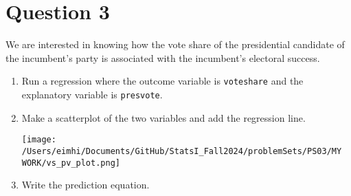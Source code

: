 \documentclass[12pt,letterpaper]{article}
\begin{document}
	\newpage	
\section*{Question 3}

\noindent We are interested in knowing how the vote share of the presidential candidate of the incumbent's party is associated with the incumbent's electoral success.
	\vspace{.25cm}
	\begin{enumerate}
		\item Run a regression where the outcome variable is \texttt{voteshare} and the explanatory variable is \texttt{presvote}.
			\vspace{1cm}
			
			  
			
			\vspace{1cm}
			
			
		\item Make a scatterplot of the two variables and add the regression line. 
		\vspace{1cm}
		
		  
		
		\vspace{1cm}
		
		\texttt{[image: /Users/eimhi/Documents/GitHub/StatsI\_Fall2024/problemSets/PS03/MY WORK/vs\_pv\_plot.png]}
		
		\vspace{1cm}
		
		\item Write the prediction equation.
		\vspace{1cm}
		
		  
		
		\vspace{1cm}
	\end{enumerate}
	

\newpage	
\end{document}

